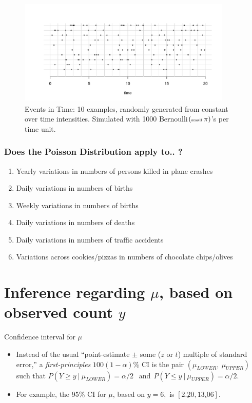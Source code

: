 \documentclass{beamer}\usepackage[]{graphicx}\usepackage[]{color}
\begin{document}
\begin{frame}
\frametitle{}
\begin{figure}[h]
	\begin{center}
		\includegraphics[width=4in,height=2in]{timeStrips63.pdf}
		\caption{Events in Time: 10 examples, randomly generated from constant over time intensities. Simulated with 1000 Bernoulli$(\tiny{\textrm{small }\pi})$'s per time unit.}
	\end{center}
\end{figure}
\end{frame}


\begin{frame}
\frametitle{Does the Poisson Distribution apply to.. ?}

\begin{enumerate}
	\setlength\itemsep{0.9em}
		\item Yearly variations in numbers of persons killed in	plane crashes 
		\item Daily variations in numbers of births
		\item Weekly variations in numbers of births
		\item Daily variations in numbers of deaths
		\item Daily variations in numbers of traffic accidents
		\item Variations across cookies/pizzas in numbers of chocolate chips/olives
\end{enumerate}
\end{frame}




\section{Inference regarding $\mu$, based on observed count $y$}

\begin{frame}{Confidence interval for $\mu$}
\begin{itemize}
		\setlength\itemsep{2em}
	\item Instead of the usual ``point-estimate $\pm$ some ($z$ or $t$) multiple of standard error,''
a \textit{first-principles} $100(1-\alpha)\%$ CI is the pair $(\mu_{LOWER},\: \mu_{UPPER})$ such that  
$P(Y \ge y \: | \: \mu_{LOWER}) = \alpha/2 \:\: \textrm{ and} \:\:  P(Y \le y \: | \: \mu_{UPPER}) = \alpha/2.$
\item For example, the  95\% CI for $\mu$, based on $y=6,$ is  $[\underline{2.20}, \underline{13.06}].$ 
\end{itemize}
\end{frame}
\end{document}
